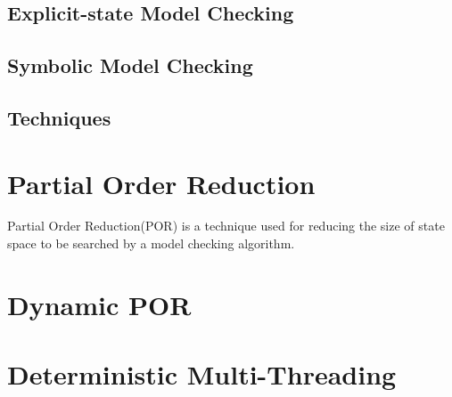 \subsection{Explicit-state Model Checking}
\subsection{Symbolic Model Checking}

\subsection{Techniques}
\section{Partial Order Reduction}

Partial Order Reduction(POR) is a technique used for reducing the size of state space to be searched by a model checking algorithm\cite{por10yrs}. 


\section{Dynamic POR}

\section{Deterministic Multi-Threading}

%
